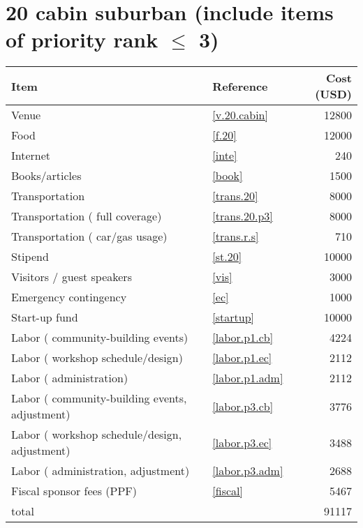 \section*{20 cabin suburban (include items of priority rank $\leq$ 3)}
\begin{center}
\begin{tabular}{llr}
Item & Reference & Cost (USD) \\ \hline
Venue & \ref{v.20.cabin} & 12800 \\
Food & \ref{f.20} & 12000 \\
Internet & \ref{inte} & 240 \\
Books/articles & \ref{book} & 1500 \\
Transportation & \ref{trans.20} & 8000 \\
Transportation ( full coverage) & \ref{trans.20.p3} & 8000 \\
Transportation ( car/gas usage) & \ref{trans.r.s} & 710 \\
Stipend & \ref{st.20} & 10000 \\
Visitors / guest speakers & \ref{vis} & 3000 \\
Emergency contingency & \ref{ec} & 1000 \\
Start-up fund & \ref{startup} & 10000 \\
Labor ( community-building events) & \ref{labor.p1.cb} & 4224 \\
Labor ( workshop schedule/design) & \ref{labor.p1.ec} & 2112 \\
Labor ( administration) & \ref{labor.p1.adm} & 2112 \\
Labor ( community-building events, adjustment) & \ref{labor.p3.cb} & 3776 \\
Labor ( workshop schedule/design, adjustment) & \ref{labor.p3.ec} & 3488 \\
Labor ( administration, adjustment) & \ref{labor.p3.adm} & 2688 \\
Fiscal sponsor fees (PPF) & \ref{fiscal} & 5467 \\ \hline
total &  & 91117
\end{tabular}
\end{center}
\newpage
